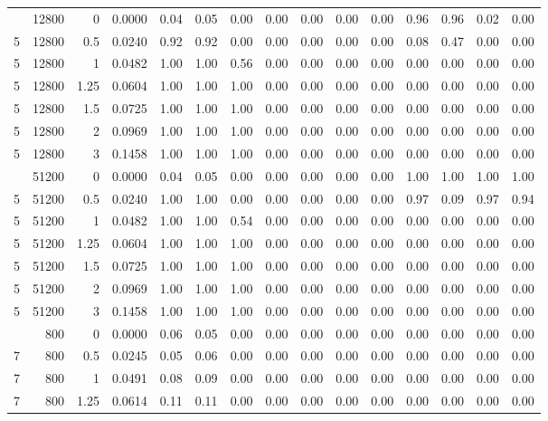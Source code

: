 \begin{table}[!htbp]
\begin{adjustbox}{max width=\textwidth, max totalheight=0.74\textheight}
\begin{tabular}{rrrrrrrrrrrrrrr}
\addlinespace
5 & 12800 & 0 & 0.0000 & 0.04 & 0.05 & 0.00 & 0.00 & 0.00 & 0.00 & 0.00 & 0.96 & 0.96 & 0.02 & 0.00 \\
5 & 12800 & 0.5 & 0.0240 & 0.92 & 0.92 & 0.00 & 0.00 & 0.00 & 0.00 & 0.00 & 0.08 & 0.47 & 0.00 & 0.00 \\
5 & 12800 & 1 & 0.0482 & 1.00 & 1.00 & 0.56 & 0.00 & 0.00 & 0.00 & 0.00 & 0.00 & 0.00 & 0.00 & 0.00 \\
5 & 12800 & 1.25 & 0.0604 & 1.00 & 1.00 & 1.00 & 0.00 & 0.00 & 0.00 & 0.00 & 0.00 & 0.00 & 0.00 & 0.00 \\
5 & 12800 & 1.5 & 0.0725 & 1.00 & 1.00 & 1.00 & 0.00 & 0.00 & 0.00 & 0.00 & 0.00 & 0.00 & 0.00 & 0.00 \\
5 & 12800 & 2 & 0.0969 & 1.00 & 1.00 & 1.00 & 0.00 & 0.00 & 0.00 & 0.00 & 0.00 & 0.00 & 0.00 & 0.00 \\
5 & 12800 & 3 & 0.1458 & 1.00 & 1.00 & 1.00 & 0.00 & 0.00 & 0.00 & 0.00 & 0.00 & 0.00 & 0.00 & 0.00 \\
\addlinespace
5 & 51200 & 0 & 0.0000 & 0.04 & 0.05 & 0.00 & 0.00 & 0.00 & 0.00 & 0.00 & 1.00 & 1.00 & 1.00 & 1.00 \\
5 & 51200 & 0.5 & 0.0240 & 1.00 & 1.00 & 0.00 & 0.00 & 0.00 & 0.00 & 0.00 & 0.97 & 0.09 & 0.97 & 0.94 \\
5 & 51200 & 1 & 0.0482 & 1.00 & 1.00 & 0.54 & 0.00 & 0.00 & 0.00 & 0.00 & 0.00 & 0.00 & 0.00 & 0.00 \\
5 & 51200 & 1.25 & 0.0604 & 1.00 & 1.00 & 1.00 & 0.00 & 0.00 & 0.00 & 0.00 & 0.00 & 0.00 & 0.00 & 0.00 \\
5 & 51200 & 1.5 & 0.0725 & 1.00 & 1.00 & 1.00 & 0.00 & 0.00 & 0.00 & 0.00 & 0.00 & 0.00 & 0.00 & 0.00 \\
5 & 51200 & 2 & 0.0969 & 1.00 & 1.00 & 1.00 & 0.00 & 0.00 & 0.00 & 0.00 & 0.00 & 0.00 & 0.00 & 0.00 \\
5 & 51200 & 3 & 0.1458 & 1.00 & 1.00 & 1.00 & 0.00 & 0.00 & 0.00 & 0.00 & 0.00 & 0.00 & 0.00 & 0.00 \\
\addlinespace
7 & 800 & 0 & 0.0000 & 0.06 & 0.05 & 0.00 & 0.00 & 0.00 & 0.00 & 0.00 & 0.00 & 0.00 & 0.00 & 0.00 \\
7 & 800 & 0.5 & 0.0245 & 0.05 & 0.06 & 0.00 & 0.00 & 0.00 & 0.00 & 0.00 & 0.00 & 0.00 & 0.00 & 0.00 \\
7 & 800 & 1 & 0.0491 & 0.08 & 0.09 & 0.00 & 0.00 & 0.00 & 0.00 & 0.00 & 0.00 & 0.00 & 0.00 & 0.00 \\
7 & 800 & 1.25 & 0.0614 & 0.11 & 0.11 & 0.00 & 0.00 & 0.00 & 0.00 & 0.00 & 0.00 & 0.00 & 0.00 & 0.00 \\

\end{tabular}
\end{adjustbox}
\end{table}
